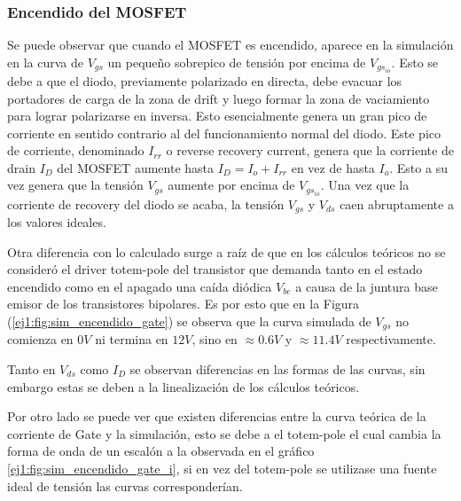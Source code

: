 \subsubsection{Encendido del MOSFET}

Se puede observar que cuando el MOSFET es encendido, aparece en la simulación en la curva de $V_{gs}$ un pequeño sobrepico de tensión por encima de $V_{gs_{io}}$. Esto se debe a que el diodo, previamente polarizado en directa, debe evacuar los portadores de carga de la zona de drift y luego formar la zona de vaciamiento para lograr polarizarse en inversa. Esto esencialmente genera un gran pico de corriente en sentido contrario al del funcionamiento normal del diodo. Este pico de corriente, denominado $I_{rr}$ o reverse recovery current, genera que la corriente de drain $I_D$ del MOSFET aumente hasta $I_D = I_o+I_{rr}$ en vez de hasta $I_o$. Esto a su vez genera que la tensión $V_{gs}$ aumente por encima de $V_{gs_{io}}$. Una vez que la corriente de recovery del diodo se acaba, la tensión $V_{gs}$ y $V_{ds}$ caen abruptamente a los valores ideales.

Otra diferencia con lo calculado surge a raíz de que en los cálculos teóricos no se consideró el driver totem-pole del transistor que demanda tanto en el estado encendido como en el apagado una caída diódica $V_{be}$ a causa de la juntura base emisor de los transistores bipolares. Es por esto que en la Figura (\ref{ej1:fig:sim_encendido_gate}) se observa que la curva simulada de $V_{gs}$ no comienza en $0V$ ni termina en $12V$, sino en $\approx 0.6V$ y $\approx 11.4V$ respectivamente.

Tanto en $V_{ds}$ como $I_D$ se observan diferencias en las formas de las curvas, sin embargo estas se deben a la linealización de los cálculos teóricos.

Por otro lado se puede ver que existen diferencias entre la curva teórica de la corriente de Gate y la simulación, esto se debe a el totem-pole  el cual cambia la forma de onda de un escalón a la observada en el gráfico \ref{ej1:fig:sim_encendido_gate_i}, si en vez del totem-pole se utilizase una fuente ideal de tensión las curvas corresponderían.

